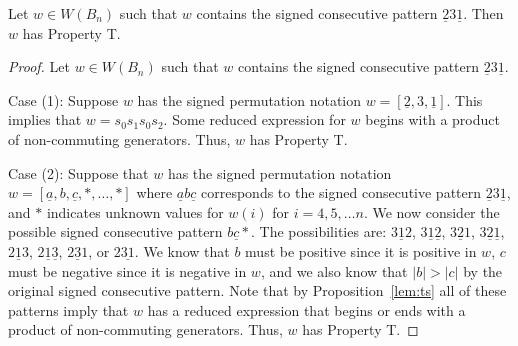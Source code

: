 \begin{proposition}\label{lem:2312}
Let $w \in W(B_n)$ such that $w$ contains the signed consecutive pattern $\underline{2}3\underline{1}$. Then $w$ has Property T.
\begin{proof}
	Let $w \in W(B_n)$ such that $w$ contains the signed consecutive pattern $\underline{2}3\underline{1}$.
	
	Case (1): Suppose $w$ has the signed permutation notation $w=[\underline{2},3,\underline{1}]$. This implies that $w=s_0s_1s_0s_2$. Some reduced expression for $w$ begins with a product of non-commuting generators. Thus, $w$ has Property T.
	
	Case (2): Suppose that $w$ has the signed permutation notation $w=[\underline{a},b,\underline{c}, \ast, \ldots, \ast]$ where $\underline{a}b\underline{c}$ corresponds to the signed consecutive pattern $\underline{2}3\underline{1}$, and $\ast$ indicates unknown values for $w(i)$ for $i=4,5, \ldots n$. We now consider the possible signed consecutive pattern $b \underline{c} \ast$. The possibilities are: $3\underline{1}2$, $3\underline{1}\underline{2}$, $3\underline{2}1$, $3 \underline{2}\underline{1}$, $2\underline{1}3$, $2\underline{1}\underline{3}$, $2\underline{3}1$, or $2 \underline{31}$. We know that $b$ must be positive since it is positive in $w$, $c$ must be negative since it is negative in $w$, and we also know that $|b|>|c|$ by the original signed consecutive pattern. Note that by Proposition~\ref{lem:ts} all of these patterns imply that $w$ has a reduced expression that begins or ends with a product of non-commuting generators. Thus, $w$ has Property T.
	

\end{proof}
\end{proposition}
